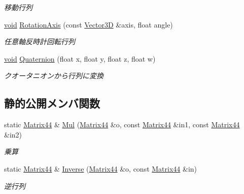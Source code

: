 \begin{DoxyCompactItemize}
\begin{DoxyCompactList}\small\item\em 移動行列 \end{DoxyCompactList}\item 
\mbox{\hyperlink{namespace_effekseer_ab34c4088e512200cf4c2716f168deb56}{void}} \mbox{\hyperlink{struct_effekseer_1_1_matrix44_a3700f1ee3139f82d2763b5acd8a2cf6f}{Rotation\+Axis}} (const \mbox{\hyperlink{struct_effekseer_1_1_vector3_d}{Vector3D}} \&axis, float angle)
\begin{DoxyCompactList}\small\item\em 任意軸反時計回転行列 \end{DoxyCompactList}\item 
\mbox{\hyperlink{namespace_effekseer_ab34c4088e512200cf4c2716f168deb56}{void}} \mbox{\hyperlink{struct_effekseer_1_1_matrix44_a18702bbfd281cc5e026dcf82d5960030}{Quaternion}} (float x, float y, float z, float w)
\begin{DoxyCompactList}\small\item\em クオータニオンから行列に変換 \end{DoxyCompactList}\end{DoxyCompactItemize}
\subsection*{静的公開メンバ関数}
\begin{DoxyCompactItemize}
\item 
static \mbox{\hyperlink{struct_effekseer_1_1_matrix44}{Matrix44}} \& \mbox{\hyperlink{struct_effekseer_1_1_matrix44_ab0200013341b97e62273a5085ee67448}{Mul}} (\mbox{\hyperlink{struct_effekseer_1_1_matrix44}{Matrix44}} \&o, const \mbox{\hyperlink{struct_effekseer_1_1_matrix44}{Matrix44}} \&in1, const \mbox{\hyperlink{struct_effekseer_1_1_matrix44}{Matrix44}} \&in2)
\begin{DoxyCompactList}\small\item\em 乗算 \end{DoxyCompactList}\item 
static \mbox{\hyperlink{struct_effekseer_1_1_matrix44}{Matrix44}} \& \mbox{\hyperlink{struct_effekseer_1_1_matrix44_a229d4f3f92aabc260d46d5f0acef4327}{Inverse}} (\mbox{\hyperlink{struct_effekseer_1_1_matrix44}{Matrix44}} \&o, const \mbox{\hyperlink{struct_effekseer_1_1_matrix44}{Matrix44}} \&in)
\begin{DoxyCompactList}\small\item\em 逆行列 \end{DoxyCompactList}\end{DoxyCompactItemize}
